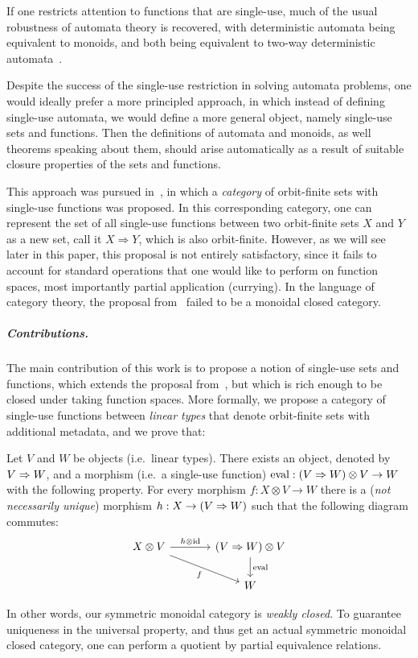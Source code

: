 \documentclass[a4paper,UKenglish,cleveref, autoref, thm-restate]{lipics-v2021}
\begin{document}
If one restricts attention to functions that are single-use, much of the usual robustness of automata theory is recovered, with deterministic automata being equivalent to monoids, and both being equivalent to two-way deterministic automata~\cite{bojanczykstefanski2020}.

Despite the success of the single-use restriction in solving automata problems, one would ideally prefer a more principled approach, in which instead of defining single-use automata, we would define a more general object, namely single-use sets and functions. Then the definitions of  automata and monoids, as well theorems speaking about them, should arise automatically as a result of suitable closure properties of the sets and functions.

This approach was pursued in~\cite{stefanski-phd}, in which a \emph{category} of orbit-finite sets with single-use functions was proposed. In this corresponding category,  one can represent the set of all single-use functions between two orbit-finite sets $X$ and $Y$ as a new set, call it $X \Rightarrow Y$, which is  also orbit-finite.  However, as we will see later in this paper, this proposal is not entirely satisfactory, since it fails to account for standard operations that one would like to perform on function spaces, most importantly partial application (currying). In the language of category theory, the proposal from~\cite{stefanski-phd} failed to be a monoidal closed category.


 \subparagraph{Contributions.}
 The main contribution of this work is to propose a notion of single-use sets and functions, which extends the proposal from~\cite{stefanski-phd}, but which is rich enough to be closed under taking function spaces. More formally, we propose a category of single-use functions between \emph{linear types} that denote orbit-finite sets with additional metadata, and we prove that:
 \begin{theorem}\label{thm:single-use-closed}
    Let $V$ and $W$ be objects (i.e.~linear types). There exists an object, denoted by  $V \Rightarrow W$, and a morphism (i.e.~a single-use function)
    $\mathrm{eval} : (V \Rightarrow W) \otimes V \to  W$
    with the following property. For every morphism
    $f : {X \otimes V} \to  W$
    there is a (\emph{not necessarily unique}) morphism
    $h :  X \to (V \Rightarrow W)$
    such that the following diagram commutes:
    \[
    \begin{tikzcd}[column sep=large]
    X \otimes V
    \arrow[r,"h \otimes \mathrm{id}"]
    \arrow[dr,"f"']
    &
    (\funspace V W) \otimes V
    \arrow[d,"\mathrm{eval}"] \\
    &
    W
    \end{tikzcd}
    \]
\end{theorem}
In other words, our symmetric monoidal category is \emph{weakly closed}. To guarantee uniqueness in the universal property, and thus get an actual symmetric monoidal closed category, one can perform a quotient by partial equivalence relations.
\end{document}
